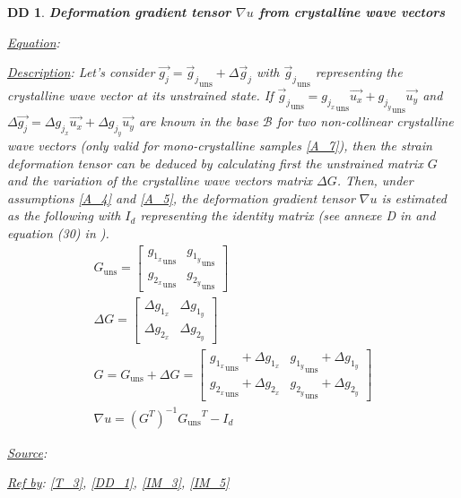 \documentclass[12pt]{article}
\newtheorem{DD}{DD}
\begin{document}
\begin{DD}
\label{DD_3}
\noindent\colorbox{shadecolorDD}{\normalfont \textbf{Deformation gradient tensor $\nabla u$ from crystalline wave vectors}}
\normalfont
\item \underline{Equation}: 
\item \underline{Description}: Let's consider $\overrightarrow{g_j} = {\overrightarrow{g}_{j}}_{\text{uns}} + \Delta \overrightarrow{g}_j$ with ${\overrightarrow{g}_{j}}_{\text{uns}}$ representing the crystalline wave vector at its unstrained state. If ${\overrightarrow{g}_{j}}_{\text{uns}}={g_{j_{x}}}_{\text{uns}}\overrightarrow{u_{x}}+{g_{j_{y}}}_{\text{uns}}\overrightarrow{u_{y}}$ and $\Delta \overrightarrow{g_{j}}=\Delta g_{j_{x}}\overrightarrow{u_{x}}+\Delta g_{j_{y}}\overrightarrow{u_{y}}$ are known in the base $\mathcal{B}$ for two non-collinear crystalline wave vectors (only valid for mono-crystalline samples \cref{A_7}), then the strain deformation tensor can be deduced by calculating first the unstrained matrix $G$ and the variation of the crystalline wave vectors matrix $\Delta G$. Then, under assumptions \cref{A_4} and \cref{A_5}, the deformation gradient tensor $\nabla u$ is estimated as the following with $I_{d}$ representing the identity matrix (see annexe D in \cite{Hytch1998} and equation (30) in \cite{Rouviere2005}). 
\begin{equation}
\begin{gathered}
	G_{\text{uns}} =
	\begin{bmatrix}
	{g_{1_{x}}}_{\text{uns}} & {g_{1_{y}}}_{\text{uns}} \\
	{g_{2_{x}}}_{\text{uns}} & {g_{2_{y}}}_{\text{uns}} 
	\end{bmatrix} \\
	\Delta G =
	\begin{bmatrix}
	\Delta g_{1_{x}} & \Delta g_{1_{y}} \\
	\Delta g_{2_{x}} & \Delta g_{2_{y}} 
	\end{bmatrix} \\
	G = G_{\text{uns}} + \Delta G = 
	\begin{bmatrix}
	{g_{1_{x}}}_{\text{uns}}+\Delta g_{1_{x}} & {g_{1_{y}}}_{\text{uns}} + \Delta g_{1_{y}} \\
	{g_{2_{x}}}_{\text{uns}}+\Delta g_{2_{x}} & {g_{2_{y}}}_{\text{uns}} + \Delta g_{2_{y}} 
	\end{bmatrix}\\
	\nabla u = ({G}^{T})^{-1}{G_{\text{uns}}}^{T}-I_{d}
\end{gathered}
\label{eq:strain_1}
\end{equation}
\item \underline{Source}: \cite{Hytch1998,Rouviere2005}
\item \underline{Ref by}: \cref{T_3}, \cref{DD_1}, \cref{IM_3}, \cref{IM_5}
\end{DD}
\end{document}
